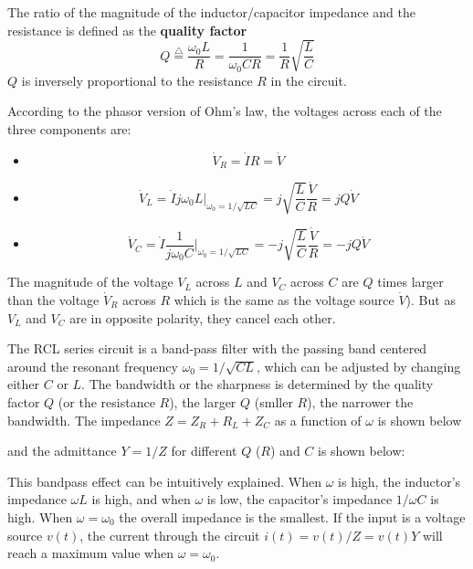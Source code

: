 The ratio of the magnitude of the inductor/capacitor impedance and the
resistance is defined as the {\bf quality factor}
\[	Q\stackrel{\triangle}{=}\frac{\omega_0L}{R}=\frac{1}{\omega_0CR}
	=\frac{1}{R}\sqrt{\frac{L}{C}}	\]
$Q$ is inversely proportional to the resistance $R$ in the circuit.

According to the phasor version of Ohm's law, the voltages across each 
of the three components are:
\begin{itemize}
\item 
\[ \dot{V}_R=\dot{I} R=\dot{V}	\]
\item 
\[ \dot{V}_L=\dot{I} j\omega_0 L|_{\omega_0=1/\sqrt{LC}}
	=j \sqrt{\frac{L}{C}} \frac{\dot{V}}{R}	=jQ\dot{V}	\]
\item 
\[ \dot{V}_C=\dot{I} \frac{1}{j\omega_0 C}|_{\omega_0=1/\sqrt{LC}}
	=-j \sqrt{\frac{L}{C}} \frac{\dot{V}}{R}=-jQ\dot{V}	\]
\end{itemize}
The magnitude of the voltage $V_L$ across $L$ and $V_C$ across $C$ are
$Q$ times larger than the voltage $\dot{V}_R$ across $R$ which is the 
same as the voltage source $\dot{V}$). But as $V_L$ and $V_C$ are in
opposite polarity, they cancel each other.

The RCL series circuit is a band-pass filter with the passing band centered
around the resonant frequency $\omega_0=1/\sqrt{CL}$, which can be adjusted
by changing either $C$ or $L$. The bandwidth or the sharpness is determined
by the quality factor $Q$ (or the resistance $R$), the larger $Q$ (smller
$R$), the narrower the bandwidth. The impedance $Z=Z_R+R_L+Z_C$ as a function 
of $\omega$ is shown below


and the admittance $Y=1/Z$ for different $Q$ ($R$) and $C$ is shown below:


This bandpass effect can be intuitively explained. When $\omega$ is high,
the inductor's impedance $\omega L$ is high, and when $\omega$ is low,
the capacitor's impedance $1/\omega C$ is high. When $\omega=\omega_0$
the overall impedance is the smallest. If the input is a voltage source 
$v(t)$, the current through the circuit $i(t)=v(t)/Z=v(t)Y$ will reach a
maximum value when $\omega=\omega_0$.

